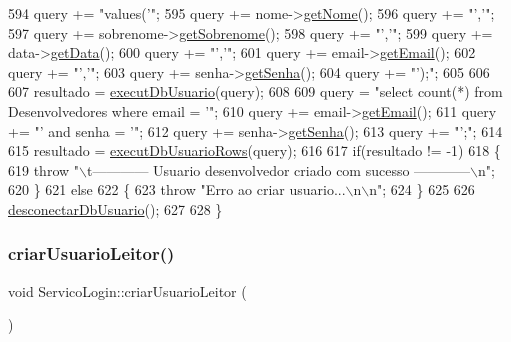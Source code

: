 \begin{DoxyCode}
594     query += \textcolor{stringliteral}{"values('"};
595     query += nome->\mbox{\hyperlink{class_nome_aad41176173eec20cbbae1576447a3697}{getNome}}();
596     query += \textcolor{stringliteral}{"','"};
597     query += sobrenome->\mbox{\hyperlink{class_sobrenome_a954491366ce07f6715f32a97d67edf04}{getSobrenome}}();
598     query += \textcolor{stringliteral}{"','"};
599     query += data->\mbox{\hyperlink{class_data_afc7b15a5e81334858e48709b2f45cdc3}{getData}}();
600     query += \textcolor{stringliteral}{"','"};
601     query += email->\mbox{\hyperlink{class_email_aa9a0e1a66b4efde65cf017bdd1c6c625}{getEmail}}();
602     query += \textcolor{stringliteral}{"','"};
603     query += senha->\mbox{\hyperlink{class_senha_a8786b3d03b1652e73df1cdce46cbbaaf}{getSenha}}();
604     query += \textcolor{stringliteral}{"');"};
605 
606 
607     resultado = \mbox{\hyperlink{comando_sql_8cpp_a748197580e7f9acdbf48c78de1f7924b}{executDbUsuario}}(query);
608 
609     query = \textcolor{stringliteral}{"select count(*) from Desenvolvedores where email = '"};
610     query += email->\mbox{\hyperlink{class_email_aa9a0e1a66b4efde65cf017bdd1c6c625}{getEmail}}();
611     query += \textcolor{stringliteral}{"' and senha = '"};
612     query += senha->\mbox{\hyperlink{class_senha_a8786b3d03b1652e73df1cdce46cbbaaf}{getSenha}}();
613     query += \textcolor{stringliteral}{"';"};
614 
615     resultado = \mbox{\hyperlink{comando_sql_8cpp_af54952694f2fa7d76f969fb74b853cb9}{executDbUsuarioRows}}(query);
616 
617     \textcolor{keywordflow}{if}(resultado != -1)
618     \{
619       \textcolor{keywordflow}{throw} \textcolor{stringliteral}{"\(\backslash\)t------------ Usuario desenvolvedor criado com sucesso ------------\(\backslash\)n"};
620     \}
621     \textcolor{keywordflow}{else}
622     \{
623       \textcolor{keywordflow}{throw} \textcolor{stringliteral}{"Erro ao criar usuario...\(\backslash\)n\(\backslash\)n"};
624     \}
625 
626     \mbox{\hyperlink{comando_sql_8cpp_a969be9911913568e30d4ae8963338bc3}{desconectarDbUsuario}}();
627 
628 \}
\end{DoxyCode}
\mbox{\label{class_servico_login_ae6786007e98ac8288dc53d025d5f5bcd}} 
\subsubsection{\texorpdfstring{criar\+Usuario\+Leitor()}{criarUsuarioLeitor()}}
{\footnotesize\ttfamily void Servico\+Login\+::criar\+Usuario\+Leitor (\begin{DoxyParamCaption}{ }\end{DoxyParamCaption})\hspace{0.3cm}{\ttfamily [virtual]}}

